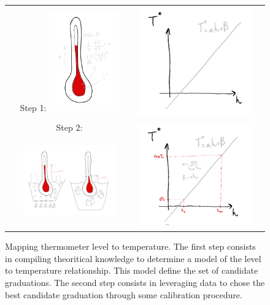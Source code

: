 \begin{bibunit}
\begin{figure}[h]
\begin{tabular}{ccc}
    Step 1: \includegraphics[clip, width=3cm, width=3cm]{Introduction/pics/therm_theroy.png} &    \includegraphics[clip, width=5cm]{Introduction/pics/therm_model.png}     \\  
     Step 2: \includegraphics[clip, width=4cm, height=4cm, trim={2cm 1cm 2cm 2cm}]{Introduction/pics/therm_obs.png} &    \includegraphics[clip, width=5cm]{Introduction/pics/therm_calib.png}     \\  
\end{tabular}

    \caption{Mapping thermometer level to temperature. The first step consists in compiling theoritical knowledge to determine a model of the level to temperature relationship. This model define the set of candidate graduations. The second step consists in leveraging data to chose the best candidate graduation through some calibration procedure.}
    \label{fig:therm_mapping}
\end{figure}


\end{bibunit}

